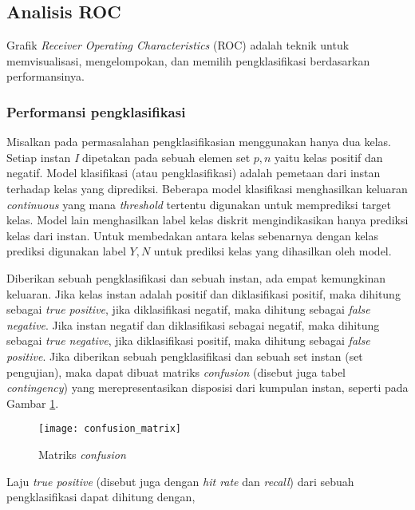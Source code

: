 \subsection{Analisis ROC}

Grafik \textit{Receiver Operating Characteristics} (ROC) adalah teknik untuk
memvisualisasi, mengelompokan, dan memilih pengklasifikasi berdasarkan
performansinya.

\subsubsection{Performansi pengklasifikasi}

Misalkan pada permasalahan pengklasifikasian menggunakan hanya dua kelas.
Setiap instan \textit{I} dipetakan pada sebuah elemen set $ {p, n} $ yaitu
kelas positif dan negatif.
Model klasifikasi (atau pengklasifikasi) adalah pemetaan dari instan terhadap
kelas yang diprediksi.
Beberapa model klasifikasi menghasilkan keluaran \textit{continuous} yang mana
\textit{threshold} tertentu digunakan untuk memprediksi target kelas.
Model lain menghasilkan label kelas diskrit mengindikasikan hanya prediksi
kelas dari instan.
Untuk membedakan antara kelas sebenarnya dengan kelas prediksi digunakan label
$ { Y, N } $ untuk prediksi kelas yang dihasilkan oleh model.

Diberikan sebuah pengklasifikasi dan sebuah instan, ada empat kemungkinan
keluaran.
Jika kelas instan adalah positif dan diklasifikasi positif, maka dihitung
sebagai \textit{true positive}, jika diklasifikasi negatif, maka dihitung
sebagai \textit{false negative}.
Jika instan negatif dan diklasifikasi sebagai negatif, maka dihitung sebagai
\textit{true negative}, jika diklasifikasi positif, maka dihitung sebagai
\textit{false positive}.
Jika diberikan sebuah pengklasifikasi dan sebuah set instan (set pengujian),
maka dapat dibuat matriks \textit{confusion} (disebut juga tabel
\textit{contingency}) yang merepresentasikan disposisi dari kumpulan instan,
seperti pada Gambar \ref{fig:confusion_matrix}.

\begin{figure}[b!]
	\centering
	\texttt{[image: confusion\_matrix]}
	\caption{Matriks \textit{confusion}}
	\label{fig:confusion_matrix}
\end{figure}

Laju \textit{true positive} (disebut juga dengan \textit{hit rate} dan
\textit{recall}) dari sebuah pengklasifikasi dapat dihitung dengan,

